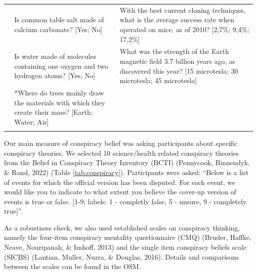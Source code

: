 \documentclass[
  doc,floatsintext]{apa6}
\begin{document}
\begin{longtable}[t]{>{\raggedleft\arraybackslash}p{2em}>{\raggedright\arraybackslash}p{22em}>{\raggedright\arraybackslash}p{22em}}
9 & Is common table salt made of calcium carbonate? [Yes; No] & With the best current cloning techniques, what is the average success rate when operated on mice, as of 2010? [2,7\%; 9,4\%; 17,2\%]\\
10 & Is water made of molecules containing one oxygen and two hydrogen atoms? [Yes; No] & What was the strength of the Earth magnetic field 3.7 billion years ago, as discovered this year? [15 microtesla; 30 microtesla; 45 microtesla]\\
\addlinespace
11 & *Where do trees mainly draw the materials with which they create their mass? [Earth; Water; Air] & \\
\bottomrule
\multicolumn{3}{l}{\rule{0pt}{1em}\textsuperscript{*} Only used in Study 1}\\
\end{longtable}
\endgroup{}

Our main measure of conspiracy belief was asking participants about specific conspiracy theories. We selected 10 science/health related conspiracy theories from the Belief in Conspiracy Theory Inventory (BCTI) (Pennycook, Binnendyk, \& Rand, 2022) (Table \ref{tab:conspiracy}). Participants were asked: ``Below is a list of events for which the official version has been disputed. For each event, we would like you to indicate to what extent you believe the cover-up version of events is true or false. {[}1-9; labels: 1 - completly false, 5 - unsure, 9 - completely true{]}''.

As a robustness check, we also used established scales on conspiracy thinking, namely the four-item conspiracy mentality questionnaire (CMQ) (Bruder, Haffke, Neave, Nouripanah, \& Imhoff, 2013) and the single item conspiracy beliefs scale (SICBS) (Lantian, Muller, Nurra, \& Douglas, 2016). Details and comparisons between the scales can be found in the OSM.

\begingroup\fontsize{8}{10}\selectfont
\end{document}
